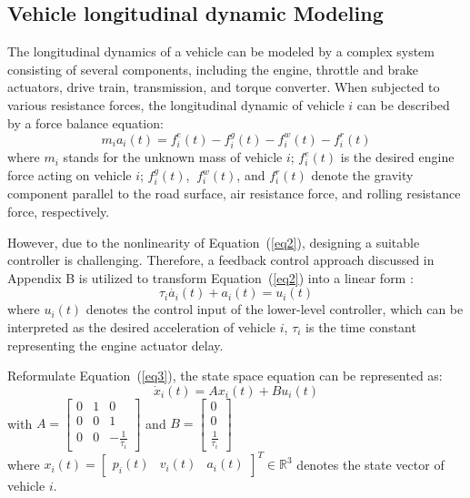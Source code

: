 \documentclass[a4paper]{cas-sc}
\begin{document}
\subsection{Vehicle longitudinal dynamic Modeling}
\label{Section 3.1}

The longitudinal dynamics of a vehicle can be modeled by a complex system consisting of several components, including the engine, throttle and brake actuators, drive train, transmission, and torque converter. When subjected to various resistance forces, the longitudinal dynamic of vehicle $i$ can be described by a force balance equation:
\begin{equation}
  m_ia_i(t)=f_i^e(t)-f_i^g(t)-f_i^w(t)-f_i^r(t)
  \label{eq2}
\end{equation}
where $m_i$ stands for the unknown mass of vehicle $i$; $f_i^e(t)$ is the desired engine force acting on vehicle $i$; $f_i^g(t)$, $\ f_i^w(t)$, and $f_i^r(t)$ denote the gravity component parallel to the road surface, air resistance force, and rolling resistance force, respectively.

However, due to the nonlinearity of Equation~(\ref{eq2}), designing a suitable controller is challenging. Therefore, a feedback control approach discussed in Appendix B is utilized to transform Equation~(\ref{eq2}) into a linear form \citep{Wang2018}:
\begin{equation}
  \tau_i\dot{a_i}\left(t\right)+a_i\left(t\right)=u_i(t)
  \label{eq3}
\end{equation}
where $u_i(t)$ denotes the control input of the lower-level controller, which can be interpreted as the desired acceleration of vehicle $i$, $\tau_i$ is the time constant representing the engine actuator delay.

Reformulate Equation~(\ref{eq3}), the state space equation can be represented as:
\begin{equation}
  {\dot x_i}\left( t \right) = A{x_i}\left( t \right) + B{u_i}\left( t \right)
  \label{eq4}
\end{equation}
with $A = \left[ {\begin{array}{*{20}{c}}
          0 & 1 & 0                          \\
          0 & 0 & 1                          \\
          0 & 0 & { - \frac{1}{{{\tau _i}}}}
        \end{array}} \right]$ and $B = \left[ {\begin{array}{*{20}{c}}
          0 \\
          0 \\
          {\frac{1}{{{\tau _i}}}}
        \end{array}} \right]$\\
where ${x_i}\left( t \right) = {\left[ {\begin{array}{*{20}{c}}
          {{p_i}\left( t \right)} & {{v_i}\left( t \right)} & {{a_i}\left( t \right)}
        \end{array}} \right]^T} \in {\mathbb{R}^3}$ denotes the state vector of vehicle $i$.
\end{document}
